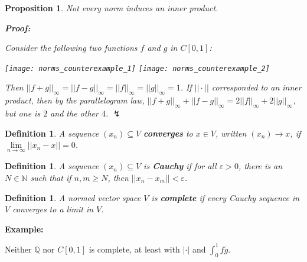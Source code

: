 \documentclass{article}
\theoremstyle{colontheorem}
\newtheorem{proposition}[theorem]{Proposition}
\newtheorem{definition}[theorem]{Definition}
\newenvironment{Proposition}
{
	\begin{mdframed}[backgroundcolor=TheoremOrange!10]
	\begin{proposition}
}
{
	\end{proposition}
	\end{mdframed}
	
	\vspace{.15in}
}
\newenvironment{Def}
{
	\begin{mdframed}[backgroundcolor=DefGreen!10]
	\begin{definition}
}
{
	\end{definition}
	\end{mdframed}
	
	\vspace{.15in}
}
\newenvironment{Proof}
{
	\begin{mdframed}[backgroundcolor=ProofPurple!10]
	\textbf{Proof:}%
}
{
	\end{mdframed}
	
	\vspace{.085in}
}
\newenvironment{Example}
{
	\begin{mdframed}
	\textbf{Example:}%
}
{
	\end{mdframed}
	
	\vspace{.15in}
}
\begin{document}
\begin{Proposition}
	
	Not every norm induces an inner product.
	
	\begin{Proof}
		Consider the following two functions $f$ and $g$ in $C[0, 1]$:
		
		\begin{center}
			
			\texttt{[image: norms\_counterexample\_1]} \texttt{[image: norms\_counterexample\_2]}
			
		\end{center}
		
		Then $||f + g||_\infty = ||f - g||_\infty = ||f||_\infty = ||g||_\infty = 1$. If $|| \cdot ||$ corresponded to an inner product, then by the parallelogram law, $||f + g||_\infty + ||f - g||_\infty = 2||f||_\infty + 2||g||_\infty$, but one is $2$ and the other $4$. $\lightning$
		
	\end{Proof}
	
\end{Proposition}



\begin{Def}
	
	A sequence $(x_n) \subseteq V$ \textbf{converges} to $x \in V$, written $(x_n) \to x$, if $\lim\limits_{n \to \infty} ||x_n - x|| = 0$.
	
\end{Def}



\begin{Def}
	
	A sequence $(x_n) \subseteq V$ is \textbf{Cauchy} if for all $\varepsilon > 0$, there is an $N \in \mathbb{N}$ such that if $n, m \geq N$, then $||x_n - x_m|| < \varepsilon$.
	
\end{Def}



\begin{Def}
	
	A normed vector space $V$ is \textbf{complete} if every Cauchy sequence in $V$ converges to a limit in $V$.
	
\end{Def}



\begin{Example}
	Neither $\mathbb{Q}$ nor $C[0, 1]$ is complete, at least with $| \cdot |$ and $\int_0^1 f\overline{g}$.
	
\end{Example}
\end{document}
